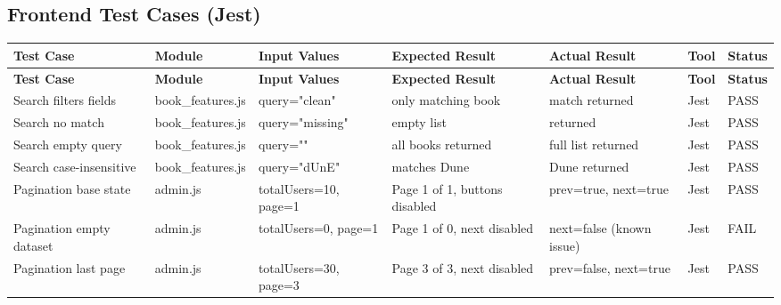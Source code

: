 \documentclass[11pt]{article}
\begin{document}
\subsection{Frontend Test Cases (Jest)}
\begin{longtable}{|>{\raggedright\arraybackslash}p{2.8cm}|>{\raggedright\arraybackslash}p{1.8cm}|>{\raggedright\arraybackslash}p{3.6cm}|>{\raggedright\arraybackslash}p{2.4cm}|>{\raggedright\arraybackslash}p{1.6cm}|>{\raggedright\arraybackslash}p{1.0cm}|>{\raggedright\arraybackslash}p{1.0cm}|}
\hline
\textbf{Test Case} & \textbf{Module} & \textbf{Input Values} & \textbf{Expected Result} & \textbf{Actual Result} & \textbf{Tool} & \textbf{Status} \\ \hline
\endfirsthead
\hline
\textbf{Test Case} & \textbf{Module} & \textbf{Input Values} & \textbf{Expected Result} & \textbf{Actual Result} & \textbf{Tool} & \textbf{Status} \\ \hline
\endhead
Search filters fields & book\_features.js & query="clean" & only matching book & 1 match returned & Jest & PASS \\ \hline
Search no match & book\_features.js & query="missing" & empty list & [] returned & Jest & PASS \\ \hline
Search empty query & book\_features.js & query="" & all books returned & full list returned & Jest & PASS \\ \hline
Search case-insensitive & book\_features.js & query="dUnE" & matches Dune & Dune returned & Jest & PASS \\ \hline
Pagination base state & admin.js & totalUsers=10, page=1 & Page 1 of 1, buttons disabled & prev=true, next=true & Jest & PASS \\ \hline
Pagination empty dataset & admin.js & totalUsers=0, page=1 & Page 1 of 0, next disabled & next=false (known issue) & Jest & FAIL \\ \hline
Pagination last page & admin.js & totalUsers=30, page=3 & Page 3 of 3, next disabled & prev=false, next=true & Jest & PASS \\ \hline
\end{longtable}
\end{document}
